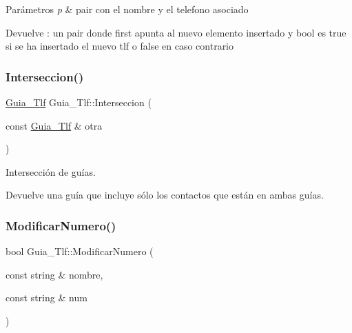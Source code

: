 \begin{DoxyParams}{Parámetros}
{\em p} & pair con el nombre y el telefono asociado \\
\hline
\end{DoxyParams}
\begin{DoxyReturn}{Devuelve}
\+: un pair donde first apunta al nuevo elemento insertado y bool es true si se ha insertado el nuevo tlf o false en caso contrario 
\end{DoxyReturn}
\mbox{\label{classGuia__Tlf_a12d8c88bb4979bd09a6c019d9158c273}} 
\subsubsection{\texorpdfstring{Interseccion()}{Interseccion()}}
{\footnotesize\ttfamily \hyperlink{classGuia__Tlf}{Guia\+\_\+\+Tlf} Guia\+\_\+\+Tlf\+::\+Interseccion (\begin{DoxyParamCaption}\item[{const \hyperlink{classGuia__Tlf}{Guia\+\_\+\+Tlf} \&}]{otra }\end{DoxyParamCaption})\hspace{0.3cm}{\ttfamily [inline]}}



Intersección de guías. 

Devuelve una guía que incluye sólo los contactos que están en ambas guías. \mbox{\label{classGuia__Tlf_ac1388585878b7832c46b9897c9be8e02}} 
\subsubsection{\texorpdfstring{Modificar\+Numero()}{ModificarNumero()}}
{\footnotesize\ttfamily bool Guia\+\_\+\+Tlf\+::\+Modificar\+Numero (\begin{DoxyParamCaption}\item[{const string \&}]{nombre,  }\item[{const string \&}]{num }\end{DoxyParamCaption})\hspace{0.3cm}{\ttfamily [inline]}}



